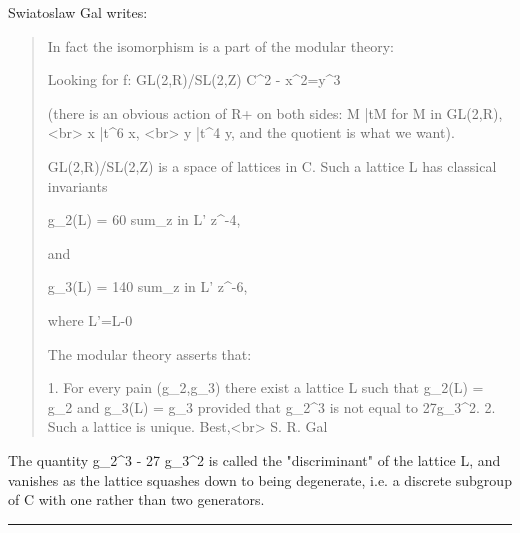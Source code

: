 Swiatoslaw Gal writes:

\begin{quote}
  In fact the isomorphism is a part of the modular theory:

  Looking for
  f: GL(2,R)/SL(2,Z) \to  C^{2} - {x^{2}=y^{3}}

  (there is an obvious action of R+ on both sides:
 M |\to  tM for M in  GL(2,R),<br>
  x |\to  t^{6} x, <br> y |\to  t^{4} y,
   and the quotient is what we want).

  GL(2,R)/SL(2,Z) is a space of lattices in C.
  Such a lattice L has classical invariants

  g_{2}(L) =  60 sum_{z in L'} z^{-4}, 

  and

   g_{3}(L) = 140 sum_{z in L'} z^{-6},
  
  where L'=L-{0}

  The modular theory asserts that:

  1. For every pain (g_{2},g_{3}) there exist a
     lattice L such that g_{2}(L) = g_{2} and
     g_{3}(L) = g_{3} provided that
     g_{2}^{3} is not equal to
     27g_{3}^{2}.
  2. Such a lattice is unique.
  Best,<br>
  S. R. Gal
\end{quote} 

The quantity g_{2}^{3} - 27
g_{3}^{2} is called the "discriminant" of the
lattice L, and vanishes as the lattice squashes down to being
degenerate, i.e. a discrete subgroup of C with one rather than two
generators.

\par\noindent\rule{\textwidth}{0.4pt}

